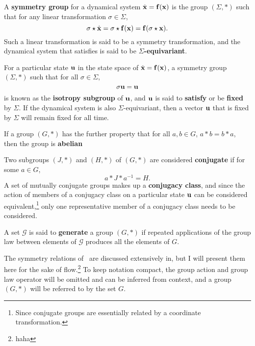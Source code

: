 \begin{define}\label{def:equivariance}
A {\bf symmetry group} for a dynamical system $\dot{\mathbf{x}} = \mathbf{f}(\mathbf{x})$  is the group $(\Sigma,\ast)$ such that for any linear transformation $\sigma \in \Sigma$, 
\begin{equation}\label{eq:kitty}
\sigma\star \dot{\mathbf{x}} = \sigma\star \mathbf{f}(\mathbf{x}) = \mathbf{f}(\sigma \star \mathbf{x}).
\end{equation}
Such a linear transformation is said to be a symmetry transformation, and the dynamical system that satisfies  is said to be {\bf $\Sigma$-equivariant}. 
\end{define}
\begin{define}
For a particular state $\mathbf{u}$ in the state space of $\dot{\mathbf{x}} = \mathbf{f}(\mathbf{x})$, a symmetry group $(\Sigma,\ast)$ such that for all $\sigma \in \Sigma$,
\begin{equation}
\sigma \mathbf{u}  = \mathbf{u}
\end{equation}
is known as the {\bf isotropy subgroup} of $\mathbf{u}$, and $\mathbf{u}$ is said to {\bf satisfy} or be {\bf fixed} by $\Sigma$. If the dynamical system is also $\Sigma$-equivariant, then a vector $\mathbf{u}$ that is fixed by $\Sigma$ will remain fixed for all time. 
\end{define}
\begin{define}
If a group $(G,\ast)$ has the further property that for all $a,b \in G$, $a \ast b = b \ast a$, then the group is {\bf abelian}
\end{define}
\begin{define}\label{def:conjugacy}
Two subgroups $(J,\ast)$ and $(H,\ast)$ of $(G,\ast)$ are considered {\bf conjugate} if for some $a \in G$,
\begin{equation}
a\ast J \ast a^{-1} = H.
\end{equation} 
A set of mutually conjugate groups makes up a {\bf conjugacy class}, and since the action of members of a conjugacy class on a particular state $\mathbf{u}$ can be considered equivalent,\footnote{Since conjugate groups are essentially related by a coordinate transformation.} only one representative member of a conjugacy class needs to be considered. 
\end{define}
\begin{define}
A set $\mathcal{G}$ is said to {\bf generate} a group $(G,\ast)$ if repeated applications of the group law between elements of $\mathcal{G}$ produces all the elements of $G$.
\end{define}
The symmetry relations of \pCf\ are discussed extensively in, but I will present them here for the sake of flow.\footnote{haha} To keep notation compact, the group action and group law operator will be omitted and can be inferred from context, and a group $(G,\ast)$ will be referred to by the set $G$. 
